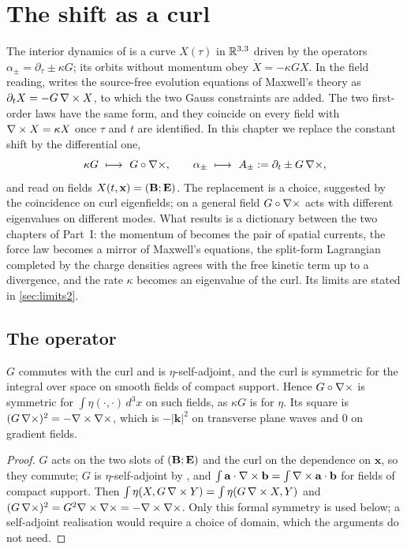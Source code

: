 \chapter{The shift as a curl}
\label{ch:curl}

The interior dynamics of  is a curve $X(\tau)$ in $\mathbb{R}^{3,3}$ driven by the operators $\alpha_\pm=\partial_\tau\pm\kappa G$;
its orbits without momentum obey $\dot X=-\kappa GX$. In the field reading,  writes the source-free evolution equations of
Maxwell's theory as $\partial_tX=-G\,\nabla\times X$, to which the two Gauss constraints are added. The two first-order laws have the same form,
and they coincide on every field with $\nabla\times X=\kappa X$ once $\tau$ and $t$ are identified. In this chapter we replace the constant shift
by the differential one,
\begin{equation}
\label{eq:lift}
\kappa G\ \longmapsto\ G\circ\curl,\qquad \alpha_\pm\ \longmapsto\ A_\pm:=\partial_t\pm G\,\curl ,
\end{equation}
and read  on fields $X(t,\mathbf x)=(\mathbf B;\mathbf E)$. The replacement is a choice, suggested by the coincidence on curl
eigenfields; on a general field $G\circ\nabla\times$ acts with different eigenvalues on different modes. What results is a dictionary between the
two chapters of Part~I: the momentum of  becomes the pair of spatial currents, the force law becomes a mirror of Maxwell's
equations, the split-form Lagrangian completed by the charge densities agrees with the free kinetic term up to a divergence, and the rate
$\kappa$ becomes an eigenvalue of the curl. Its limits are stated in \cref{sec:limits2}.

\section{The operator}

\begin{lemma}
\label{lem:selfadj}
$G$ commutes with the curl and is $\eta$-self-adjoint, and the curl is symmetric for the integral over space on smooth fields of compact
support. Hence $G\circ\nabla\times$ is symmetric for $\int\eta(\cdot,\cdot)\,d^3x$ on such fields, as $\kappa G$ is for $\eta$. Its square is
$(G\,\nabla\times)^2=-\nabla\times\nabla\times$, which is $-|\mathbf k|^2$ on transverse plane waves and $0$ on gradient fields.
\end{lemma}

\begin{proof}
$G$ acts on the two slots of $(\mathbf B;\mathbf E)$ and the curl on the dependence on $\mathbf x$, so they commute; $G$ is $\eta$-self-adjoint by
, and $\int\mathbf a\cdot\nabla\times\mathbf b=\int\nabla\times\mathbf a\cdot\mathbf b$ for fields of compact support. Then
$\int\eta(X,G\,\nabla\times Y)=\int\eta(G\,\nabla\times X,Y)$ and $(G\,\nabla\times)^2=G^2\nabla\times\nabla\times=-\nabla\times\nabla\times$. Only this formal symmetry is used below; a
self-adjoint realisation would require a choice of domain, which the arguments do not need.
\end{proof}

